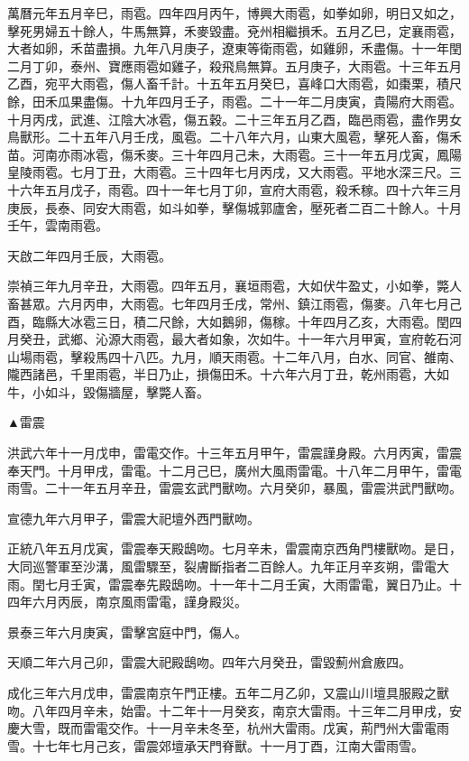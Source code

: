 \begin{pinyinscope}
萬曆元年五月辛巳，雨雹。四年四月丙午，博興大雨雹，如拳如卵，明日又如之，擊死男婦五十餘人，牛馬無算，禾麥毀盡。兗州相繼損禾。五月乙巳，定襄雨雹，大者如卵，禾苗盡損。九年八月庚子，遼東等衛雨雹，如雞卵，禾盡傷。十一年閏二月丁卯，泰州、寶應雨雹如雞子，殺飛鳥無算。五月庚子，大雨雹。十三年五月乙酉，宛平大雨雹，傷人畜千計。十五年五月癸巳，喜峰口大雨雹，如棗栗，積尺餘，田禾瓜果盡傷。十九年四月壬子，雨雹。二十一年二月庚寅，貴陽府大雨雹。十月丙戌，武進、江陰大冰雹，傷五穀。二十三年五月乙酉，臨邑雨雹，盡作男女鳥獸形。二十五年八月壬戌，風雹。二十八年六月，山東大風雹，擊死人畜，傷禾苗。河南亦雨冰雹，傷禾麥。三十年四月己未，大雨雹。三十一年五月戊寅，鳳陽皇陵雨雹。七月丁丑，大雨雹。三十四年七月丙戌，又大雨雹。平地水深三尺。三十六年五月戊子，雨雹。四十一年七月丁卯，宣府大雨雹，殺禾稼。四十六年三月庚辰，長泰、同安大雨雹，如斗如拳，擊傷城郭廬舍，壓死者二百二十餘人。十月壬午，雲南雨雹。

天啟二年四月壬辰，大雨雹。

崇禎三年九月辛丑，大雨雹。四年五月，襄垣雨雹，大如伏牛盈丈，小如拳，斃人畜甚眾。六月丙申，大雨雹。七年四月壬戌，常州、鎮江雨雹，傷麥。八年七月己酉，臨縣大冰雹三日，積二尺餘，大如鵝卵，傷稼。十年四月乙亥，大雨雹。閏四月癸丑，武鄉、沁源大雨雹，最大者如象，次如牛。十一年六月甲寅，宣府乾石河山場雨雹，擊殺馬四十八匹。九月，順天雨雹。十二年八月，白水、同官、雒南、隴西諸邑，千里雨雹，半日乃止，損傷田禾。十六年六月丁丑，乾州雨雹，大如牛，小如斗，毀傷牆屋，擊斃人畜。

▲雷震

洪武六年十一月戊申，雷電交作。十三年五月甲午，雷震謹身殿。六月丙寅，雷震奉天門。十月甲戌，雷電。十二月己巳，廣州大風雨雷電。十八年二月甲午，雷電雨雪。二十一年五月辛丑，雷震玄武門獸吻。六月癸卯，暴風，雷震洪武門獸吻。

宣德九年六月甲子，雷震大祀壇外西門獸吻。

正統八年五月戊寅，雷震奉天殿鴟吻。七月辛未，雷震南京西角門樓獸吻。是日，大同巡警軍至沙溝，風雷驟至，裂膚斷指者二百餘人。九年正月辛亥朔，雷電大雨。閏七月壬寅，雷震奉先殿鴟吻。十一年十二月壬寅，大雨雷電，翼日乃止。十四年六月丙辰，南京風雨雷電，謹身殿災。

景泰三年六月庚寅，雷擊宮庭中門，傷人。

天順二年六月己卯，雷震大祀殿鴟吻。四年六月癸丑，雷毀薊州倉廒四。

成化三年六月戊申，雷震南京午門正樓。五年二月乙卯，又震山川壇具服殿之獸吻。八年四月辛未，始雷。十二年十一月癸亥，南京大雷雨。十三年二月甲戌，安慶大雪，既而雷電交作。十一月辛未冬至，杭州大雷雨。戊寅，荊門州大雷電雨雪。十七年七月己亥，雷震郊壇承天門脊獸。十一月丁酉，江南大雷雨雪。


\end{pinyinscope}
